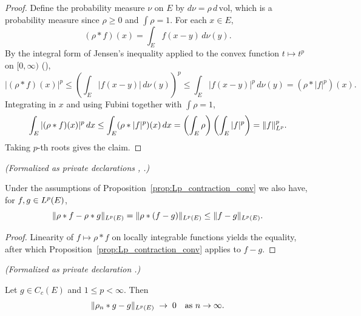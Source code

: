 \begin{proof}
\leanok

Define the probability measure $\nu$ on $E$ by $d\nu = \rho\,d\,\mathrm{vol}$,
which is a probability measure since $\rho \ge 0$ and $\int \rho = 1$. For each
$x \in E$,
\begin{equation*}
  (\rho * f)(x) = \int_E f(x - y)\,d\nu(y).
\end{equation*}
By the integral form of Jensen's inequality applied to the convex function
$t \mapsto t^p$ on $[0,\infty)$ (),
\begin{equation*}
  |(\rho * f)(x)|^p
    \le \left(\int_E |f(x-y)|\,d\nu(y)\right)^p
    \le \int_E |f(x-y)|^p \,d\nu(y)
    = (\rho * |f|^p)(x).
\end{equation*}
Integrating in $x$ and using Fubini together with $\int \rho = 1$,
\begin{equation*}
  \int_E |(\rho * f)(x)|^p\,dx \le \int_E (\rho * |f|^p)(x)\,dx
    = \left(\int_E \rho\right)\left(\int_E |f|^p\right)
    = \|f\|_{L^{p}}^p.
\end{equation*}
Taking $p$-th roots gives the claim.
\end{proof}

\begin{corollary}
\label{cor:conv_sub}
\leanok
\noindent\textit{(Formalized as private declarations , .)}\par
Under the assumptions of Proposition~\ref{prop:Lp_contraction_conv} we also
have, for $f, g \in L^{p}(E)$,
\begin{equation*}
  \|\rho * f - \rho * g\|_{L^{p}(E)} = \|\rho * (f - g)\|_{L^{p}(E)}
   \le \|f - g\|_{L^{p}(E)}.
\end{equation*}
\end{corollary}

\begin{proof}
\leanok
{}

Linearity of $f \mapsto \rho * f$ on locally integrable functions yields the
equality, after which Proposition~\ref{prop:Lp_contraction_conv} applies to
$f - g$.
\end{proof}

\begin{lemma}
\label{lem:conv_approx_cont}
\leanok
\noindent\textit{(Formalized as private declaration .)}\par
Let $g \in C_c(E)$ and $1 \le p < \infty$. Then
\begin{equation*}
  \|\rho_n * g - g\|_{L^{p}(E)} \;\to\; 0 \quad\text{as } n \to \infty.
\end{equation*}
\end{lemma}

